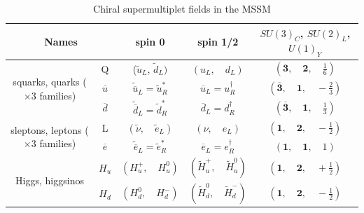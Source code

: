 \documentclass[12pt]{report}
\begin{document}
\begin{table}[htdp]
\begin{center}
{\renewcommand{\arraystretch}{1.5}%
\begin{tabular}{|c|c|c|c|c|}
\hline
\multicolumn{2}{|c|}{Names} & spin 0 & spin 1/2 & $SU(3)_{C}$, $SU(2)_{L}$, $U(1)_{Y}$\\
\hline
\hline
\multirow{3}{3cm}{squarks, quarks ($\times 3$ families)} &Q & ($\widetilde{u}_{L}$, \quad $\widetilde{d}_{L})$ & $(u_{L}, \quad d_{L})$ & $(\mathbf{3}, \quad \mathbf{2}, \quad \frac{1}{6})$\\
& $\overline{u}$ & $\widetilde{\overline{u}}_{L} = \widetilde{u}^{*}_{R}$ & $\overline{u}_{L} = u^{\dag}_{R}$ & $(\overline{\mathbf{3}}, \quad \mathbf{1}, \quad -\frac{2}{3})$\\
& $\overline{d}$ & $\widetilde{\overline{d}}_{L}= \widetilde{d}^{*}_{R}$ & $\overline{d}_{L} =d^{\dag}_{R}$ & $(\overline{\mathbf{3}}, \quad \mathbf{1}, \quad \frac{1}{3})$\\
\hline
\multirow{2}{3cm}{sleptons, leptons ($\times 3$ families)} & L & $(\widetilde{\nu}, \quad \widetilde{e}_{L})$ & $(\nu, \quad e_{L})$ & $(\mathbf{1}, \quad \mathbf{2}, \quad -\frac{1}{2})$\\
& $\overline{e}$ & $\widetilde{\overline{e}}_{L} =\widetilde{e}^{*}_{R}$ & $\overline{e}_{L} = e^{\dag}_{R}$ & $(\mathbf{1}, \quad \mathbf{1}, \quad 1)$\\
\hline
\multirow{2}{*}{Higgs, higgsinos} & $H_{u}$ & $(H^{+}_{u}, \quad H^{0}_{u})$ & $(\widetilde{H}^{+}_{u}, \quad \widetilde{H}^{0}_{u})$ & $(\mathbf{1}, \quad \mathbf{2}, \quad +\frac{1}{2})$\\
& $H_{d}$ & $(H^{0}_{d}, \quad H^{-}_{d})$ & $(\widetilde{H}^{0}_{d}, \quad \widetilde{H}^{-}_{d})$ & $(\mathbf{1}, \quad \mathbf{2}, \quad -\frac{1}{2})$\\
\hline
\end{tabular}
}%
\end{center}
\caption{Chiral supermultiplet fields in the MSSM}
\label{table: chiral supermultiplets in the MSSM}
\end{table}%
\end{document}
